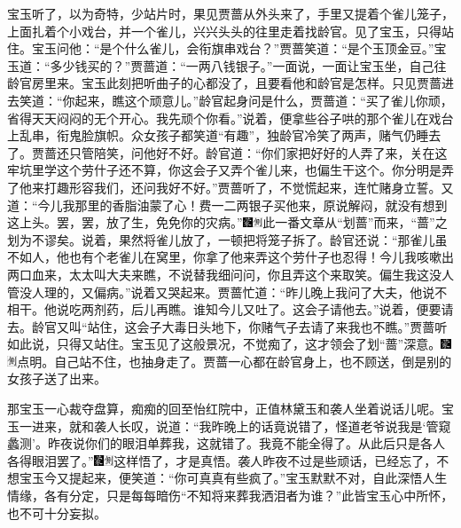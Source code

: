 宝玉听了，以为奇特，少站片时，果见贾蔷从外头来了，手里又提着个雀儿笼子，上面扎着个小戏台，并一个雀儿，兴兴头头的往里走着找龄官。见了宝玉，只得站住。宝玉问他：``是个什么雀儿，会衔旗串戏台？''贾蔷笑道：``是个玉顶金豆。''宝玉道：``多少钱买的？''贾蔷道：``一两八钱银子。''一面说，一面让宝玉坐，自己往龄官房里来。宝玉此刻把听曲子的心都没了，且要看他和龄官是怎样。只见贾蔷进去笑道：``你起来，瞧这个顽意儿。''龄官起身问是什么，贾蔷道：``买了雀儿你顽，省得天天闷闷的无个开心。我先顽个你看。''说着，便拿些谷子哄的那个雀儿在戏台上乱串，衔鬼脸旗帜。众女孩子都笑道``有趣''，独龄官冷笑了两声，赌气仍睡去了。贾蔷还只管陪笑，问他好不好。龄官道：``你们家把好好的人弄了来，关在这牢坑里学这个劳什子还不算，你这会子又弄个雀儿来，也偏生干这个。你分明是弄了他来打趣形容我们，还问我好不好。''贾蔷听了，不觉慌起来，连忙赌身立誓。又道：``今儿我那里的香脂油蒙了心！费一二两银子买他来，原说解闷，就没有想到这上头。罢，罢，放了生，免免你的灾病。''{\includegraphics[width=3mm]{../Images/00006}\includegraphics[width=3mm]{../Images/00011}\footnotesize \kaishu 此一番文章从``划蔷''而来，``蔷''之划为不谬矣。}说着，果然将雀儿放了，一顿把将笼子拆了。龄官还说：``那雀儿虽不如人，他也有个老雀儿在窝里，你拿了他来弄这个劳什子也忍得！今儿我咳嗽出两口血来，太太叫大夫来瞧，不说替我细问问，你且弄这个来取笑。偏生我这没人管没人理的，又偏病。''说着又哭起来。贾蔷忙道：``昨儿晚上我问了大夫，他说不相干。他说吃两剂药，后儿再瞧。谁知今儿又吐了。这会子请他去。''说着，便要请去。龄官又叫``站住，这会子大毒日头地下，你赌气子去请了来我也不瞧。''贾蔷听如此说，只得又站住。宝玉见了这般景况，不觉痴了，这才领会了划``蔷''深意。{\includegraphics[width=3mm]{../Images/00006}\includegraphics[width=3mm]{../Images/00011}\footnotesize \kaishu 点明。}自己站不住，也抽身走了。贾蔷一心都在龄官身上，也不顾送，倒是别的女孩子送了出来。

那宝玉一心裁夺盘算，痴痴的回至怡红院中，正值林黛玉和袭人坐着说话儿呢。宝玉一进来，就和袭人长叹，说道：``我昨晚上的话竟说错了，怪道老爷说我是`管窥蠡测'。昨夜说你们的眼泪单葬我，这就错了。我竟不能全得了。从此后只是各人各得眼泪罢了。''{\includegraphics[width=3mm]{../Images/00006}\includegraphics[width=3mm]{../Images/00011}\footnotesize \kaishu 这样悟了，才是真悟。}袭人昨夜不过是些顽话，已经忘了，不想宝玉今又提起来，便笑道：``你可真真有些疯了。''宝玉默默不对，自此深悟人生情缘，各有分定，只是每每暗伤``不知将来葬我洒泪者为谁？''此皆宝玉心中所怀，也不可十分妄拟。

